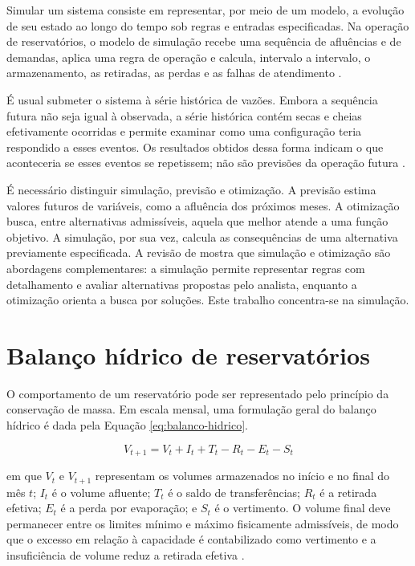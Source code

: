 Simular um sistema consiste em representar, por meio de um modelo, a evolução de seu estado ao longo do tempo sob regras e entradas especificadas. Na operação de reservatórios, o modelo de simulação recebe uma sequência de afluências e de demandas, aplica uma regra de operação e calcula, intervalo a intervalo, o armazenamento, as retiradas, as perdas e as falhas de atendimento \cite{loucksVanBeek2017}.

É usual submeter o sistema à série histórica de vazões. Embora a sequência futura não seja igual à observada, a série histórica contém secas e cheias efetivamente ocorridas e permite examinar como uma configuração teria respondido a esses eventos. Os resultados obtidos dessa forma indicam o que aconteceria se esses eventos se repetissem; não são previsões da operação futura \cite{loucksVanBeek2017}.

É necessário distinguir simulação, previsão e otimização. A previsão estima valores futuros de variáveis, como a afluência dos próximos meses. A otimização busca, entre alternativas admissíveis, aquela que melhor atende a uma função objetivo. A simulação, por sua vez, calcula as consequências de uma alternativa previamente especificada. A revisão de  mostra que simulação e otimização são abordagens complementares: a simulação permite representar regras com detalhamento e avaliar alternativas propostas pelo analista, enquanto a otimização orienta a busca por soluções. Este trabalho concentra-se na simulação.

\section{Balanço hídrico de reservatórios}
\label{sec:balanco-hidrico}

O comportamento de um reservatório pode ser representado pelo princípio da conservação de massa. Em escala mensal, uma formulação geral do balanço hídrico é dada pela Equação \ref{eq:balanco-hidrico}.

\begin{equation}
    V_{t+1} = V_t + I_t + T_t - R_t - E_t - S_t
    \label{eq:balanco-hidrico}
\end{equation}

em que $V_t$ e $V_{t+1}$ representam os volumes armazenados no início e no final do mês $t$; $I_t$ é o volume afluente; $T_t$ é o saldo de transferências; $R_t$ é a retirada efetiva; $E_t$ é a perda por evaporação; e $S_t$ é o vertimento. O volume final deve permanecer entre os limites mínimo e máximo fisicamente admissíveis, de modo que o excesso em relação à capacidade é contabilizado como vertimento e a insuficiência de volume reduz a retirada efetiva \cite{ceara2021aloca}.

